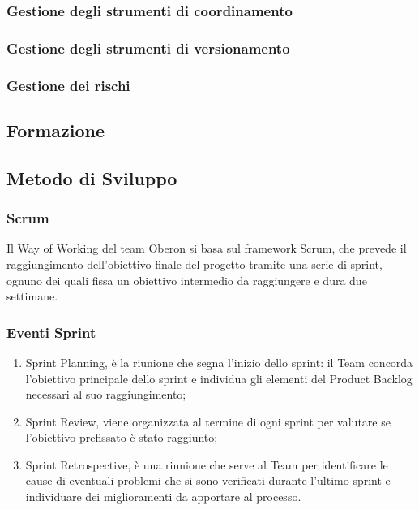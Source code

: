 \subsubsection{Gestione degli strumenti di coordinamento}
\subsubsection{Gestione degli strumenti di versionamento}
\subsubsection{Gestione dei rischi}

\subsection{Formazione}

\subsection{Metodo di Sviluppo}
\subsubsection{Scrum}
Il Way of Working del team Oberon si basa sul framework Scrum, che prevede il raggiungimento dell’obiettivo finale del progetto tramite una serie di sprint, ognuno dei quali fissa un obiettivo intermedio da raggiungere e dura due settimane. 
\subsubsection{Eventi Sprint}
\begin{enumerate}
\item Sprint Planning, è la riunione che segna l’inizio dello sprint: il Team concorda l’obiettivo principale dello sprint e individua gli elementi del Product Backlog necessari al suo raggiungimento; 
\item Sprint Review, viene organizzata al termine di ogni sprint per valutare se l’obiettivo prefissato è stato raggiunto; 
\item Sprint Retrospective, è una riunione che serve al Team per identificare le cause di eventuali problemi che si sono verificati durante l’ultimo sprint e individuare dei miglioramenti da apportare al processo. 
\end{enumerate}
